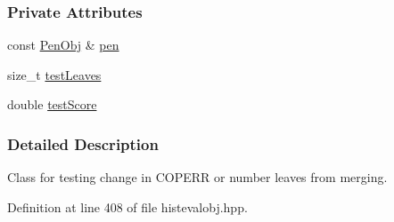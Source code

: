 \subsubsection*{\-Private \-Attributes}
\begin{DoxyCompactItemize}
\item 
const \hyperlink{classsubpavings_1_1PenObj}{\-Pen\-Obj} \& \hyperlink{classsubpavings_1_1CritCOPERRMergeChangeOrLeaves__LTE_aff23c038312142d8ff98afbadee5c1c0}{pen}
\item 
size\-\_\-t \hyperlink{classsubpavings_1_1CritCOPERRMergeChangeOrLeaves__LTE_a7890e344b86bc0b15a8becd7922d0bb9}{test\-Leaves}
\item 
double \hyperlink{classsubpavings_1_1CritCOPERRMergeChangeOrLeaves__LTE_aad06f142352ae025ac483345e29ce06f}{test\-Score}
\end{DoxyCompactItemize}


\subsubsection{\-Detailed \-Description}
\-Class for testing change in \-C\-O\-P\-E\-R\-R or number leaves from merging. 

\-Definition at line 408 of file histevalobj.\-hpp.



